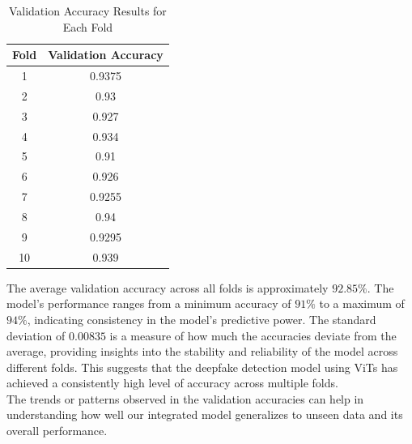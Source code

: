 \begin{table}[ht]
    \centering
    \renewcommand{\arraystretch}{1.5}
    \begin{tabular}{|c|c|}
        \hline
        \textbf{Fold} & \textbf{Validation Accuracy} \\
        \hline
        1             & 0.9375                       \\
        \hline
        2             & 0.93                         \\
        \hline
        3             & 0.927                        \\
        \hline
        4             & 0.934                        \\
        \hline
        5             & 0.91                         \\
        \hline
        6             & 0.926                        \\
        \hline
        7             & 0.9255                       \\
        \hline
        8             & 0.94                         \\
        \hline
        9             & 0.9295                       \\
        \hline
        10            & 0.939                        \\
        \hline
    \end{tabular}
    \caption{Validation Accuracy Results for Each Fold}
    \label{tab:kfold_results}
\end{table}

\noindent The average validation accuracy across all folds is approximately \(92.85\%\). The model's performance ranges from a minimum accuracy of \(91\%\) to a maximum of \(94\%\), indicating consistency in the model's predictive power. The standard deviation of \(0.00835\) is a measure of how much the accuracies deviate from the average, providing insights into the stability and reliability of the model across different folds. This suggests that the deepfake detection model using ViTs has achieved a consistently high level of accuracy across multiple folds.\\

\noindent The trends or patterns observed in the validation accuracies can help in understanding how well our integrated model generalizes to unseen data and its overall performance.


\newpage
